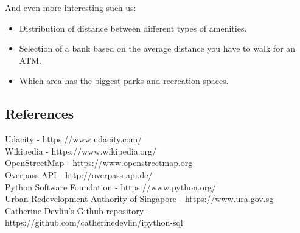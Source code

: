 \documentclass[11pt]{article}
\providecommand{\tightlist}{%
      \setlength{\itemsep}{0pt}\setlength{\parskip}{0pt}}
\begin{document}
And even more interesting such us:

\begin{itemize}
\tightlist
\item
  Distribution of distance between different types of amenities.
\item
  Selection of a bank based on the average distance you have to walk for
  an ATM.
\item
  Which area has the biggest parks and recreation spaces.
\end{itemize}

    \subsection*{References}\label{references}

    Udacity - https://www.udacity.com/\\
Wikipedia - https://www.wikipedia.org/\\
OpenStreetMap - https://www.openstreetmap.org\\
Overpass API - http://overpass-api.de/\\
Python Software Foundation - https://www.python.org/\\
Urban Redevelopment Authority of Singapore - https://www.ura.gov.sg\\
Catherine Devlin's Github repository -
https://github.com/catherinedevlin/ipython-sql


    
    
    
    
\end{document}
